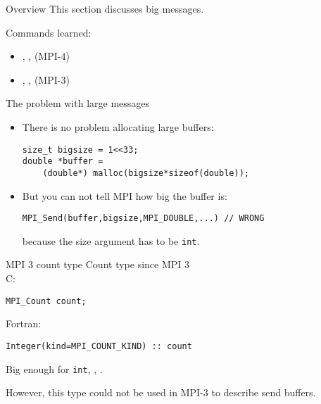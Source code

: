 
\begin{numberedframe}{Overview}
  This section discusses big messages.

  Commands learned:
  \begin{itemize}
  \item {}, ,
     (MPI-4)
  \item {}, ,
     (MPI-3)
  \end{itemize}
\end{numberedframe}

\begin{numberedframe}{The problem with large messages}
  \begin{itemize}
  \item There is no problem allocating large buffers:
\begin{lstlisting}
size_t bigsize = 1<<33;
double *buffer =
    (double*) malloc(bigsize*sizeof(double));
\end{lstlisting}
\item But you can not tell MPI how big the buffer is:
\begin{lstlisting}
MPI_Send(buffer,bigsize,MPI_DOUBLE,...) // WRONG
\end{lstlisting}
because the size argument has to be \lstinline{int}.
  \end{itemize}
\end{numberedframe}

\begin{numberedframe}{MPI 3 count type}
  Count type since MPI 3\\
  C:
\begin{lstlisting}
MPI_Count count;
\end{lstlisting}
Fortran:
\lstset{language=Fortran}
\begin{lstlisting}
Integer(kind=MPI_COUNT_KIND) :: count
\end{lstlisting}
\lstset{language=C}
Big enough for \lstinline{int}, , .

However, this type could not be used in MPI-3 to describe send buffers.
\end{numberedframe}


